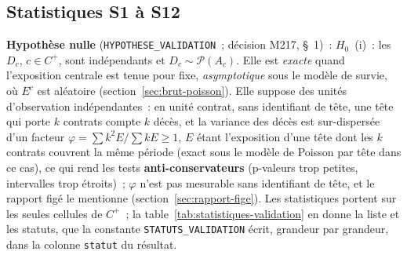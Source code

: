 \documentclass[a4paper,11pt]{article}
\newcommand{\code}[1]{\texttt{\small #1}}
\begin{document}
\subsection{Statistiques S1 à S12}
\label{sec:validation-statistiques}

\textbf{Hypothèse nulle} (\code{HYPOTHESE\_VALIDATION}~; décision M217,
§~1)~: $H_0$~(i)~: les $D_c$, $c \in C^{+}$, sont indépendants et $D_c \sim
\mathcal{P}(A_c)$. Elle est \emph{exacte} quand l'exposition centrale est
tenue pour fixe, \emph{asymptotique} sous le modèle de survie, où $E^c$ est
aléatoire (section~\ref{sec:brut-poisson}). Elle suppose des unités
d'observation indépendantes~: en unité contrat, sans identifiant de tête,
une tête qui porte $k$ contrats compte $k$ décès, et la variance des décès
est sur-dispersée d'un facteur $\varphi = \sum k^2 E / \sum k E \ge 1$,
$E$ étant l'exposition d'une tête dont les $k$ contrats couvrent la même
période (exact sous le modèle de Poisson par tête dans ce cas), ce qui rend les tests
\textbf{anti-conservateurs} (p-valeurs trop petites, intervalles trop
étroits)~; $\varphi$ n'est pas mesurable sans identifiant de tête, et le
rapport figé le mentionne (section~\ref{sec:rapport-fige}). Les
statistiques portent sur les seules cellules de $C^{+}$~; la
table~\ref{tab:statistiques-validation} en donne la liste et les statuts,
que la constante \code{STATUTS\_VALIDATION} écrit, grandeur par grandeur,
dans la colonne \code{statut} du résultat.
\end{document}
